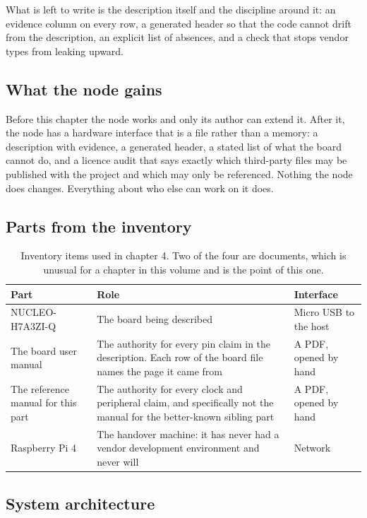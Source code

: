 What is left to write is the description itself and the discipline around it: an
evidence column on every row, a generated header so that the code cannot drift
from the description, an explicit list of absences, and a check that stops
vendor types from leaking upward.

\subsection*{What the node gains}

Before this chapter the node works and only its author can extend it. After it,
the node has a hardware interface that is a file rather than a memory: a
description with evidence, a generated header, a stated list of what the board
cannot do, and a licence audit that says exactly which third-party files may be
published with the project and which may only be referenced. Nothing the node
does changes. Everything about who else can work on it does.

\subsection*{Parts from the inventory}

\begin{table}[H]\centering\small
\begin{tabular}{p{40mm}p{66mm}p{40mm}}
\toprule
Part & Role & Interface \\
\midrule
NUCLEO-H7A3ZI-Q & The board being described & Micro USB to the host \\
The board user manual & The authority for every pin claim in the description. Each row of the board file names the page it came from & A PDF, opened by hand \\
The reference manual for this part & The authority for every clock and peripheral claim, and specifically not the manual for the better-known sibling part & A PDF, opened by hand \\
Raspberry Pi 4 & The handover machine: it has never had a vendor development environment and never will & Network \\
\bottomrule
\end{tabular}
\caption{Inventory items used in chapter 4. Two of the four are documents, which is unusual for a chapter in this volume and is the point of this one.}
\end{table}

\subsection*{System architecture}

